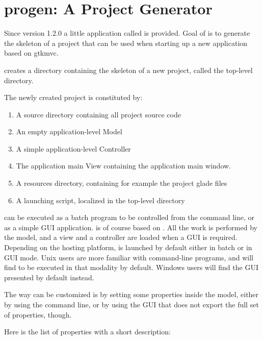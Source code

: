 \section{progen: A Project Generator}

Since version 1.2.0 a little application called 
is provided. Goal of  is to generate the skeleton
of a project that can be used when starting up a new application
based on gtkmvc.

 creates a directory containing the skeleton of a
new project, called the top-level directory.

The newly created project is constituted by:
\begin{enumerate}
\item A source directory containing all project source code
\item An empty application-level Model
\item A simple application-level Controller
\item The application main View containing the application main window. 
\item A resources directory, containing for example the project
  glade files
\item A launching script, localized in the top-level directory
\end{enumerate}


 can be executed as a batch program to be
controlled from the command line, or as a simple GUI
application.  is of course based on \pygtkmvc. All
the work is performed by the model, and a view and a controller are
loaded when a GUI is required. Depending on the hosting platform,
 is launched by default either in batch or in GUI
mode. Unix users are more familiar with command-line programs, and
will find  to be executed in that modality by
default. Windows users will find the GUI presented by default
instead.

The way  can be customized is by setting some
properties inside the model, either by using the command line, or by
using the GUI that does not export the full set of properties,
though.

Here is the list of properties with a short description:

